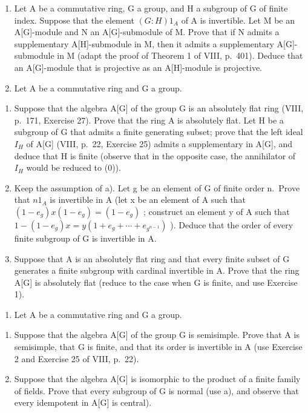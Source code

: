 
\begin{enumerate}
\def\labelenumi{\arabic{enumi})}
\item
  Let A be a commutative ring, G a group, and H a subgroup of G of finite index. Suppose that the element \((G:H)1_{A}\) of A is invertible. Let M be an A{[}G{]}-module and N an A{[}G{]}-submodule of M. Prove that if N admits a supplementary A{[}H{]}-submodule in M, then it admits a supplementary A{[}G{]}-submodule in M (adapt the proof of Theorem 1 of VIII, p.~401). Deduce that an A{[}G{]}-module that is projective as an A{[}H{]}-module is projective.
\item
  Let A be a commutative ring and G a group.
\end{enumerate}

\begin{enumerate}
\def\labelenumi{\alph{enumi})}
\item
  Suppose that the algebra A{[}G{]} of the group G is an absolutely flat ring (VIII, p.~171, Exercise 27). Prove that the ring A is absolutely flat. Let H be a subgroup of G that admits a finite generating subset; prove that the left ideal \(I_{H}\) of A{[}G{]} (VIII, p.~22, Exercise 25) admits a supplementary in A{[}G{]}, and deduce that H is finite (observe that in the opposite case, the annihilator of \(I_{H}\) would be reduced to (0)).
\item
  Keep the assumption of a). Let g be an element of G of finite order n.~Prove that \(n1_{A}\) is invertible in A (let x be an element of A such that \((1-e_{g})x(1-e_{g})=(1-e_{g})\) ; construct an element y of A such that \(1-(1-e_{g})x=y(1+e_{g}+\cdots+e_{g^{n-1}})\) ). Deduce that the order of every finite subgroup of G is invertible in A.
\item
  Suppose that A is an absolutely flat ring and that every finite subset of G generates a finite subgroup with cardinal invertible in A. Prove that the ring A{[}G{]} is absolutely flat (reduce to the case when G is finite, and use Exercise 1).
\end{enumerate}

\begin{enumerate}
\def\labelenumi{\arabic{enumi})}
\setcounter{enumi}{2}
\tightlist
\item
  Let A be a commutative ring and G a group.
\end{enumerate}

\begin{enumerate}
\def\labelenumi{\alph{enumi})}
\item
  Suppose that the algebra A{[}G{]} of the group G is semisimple. Prove that A is semisimple, that G is finite, and that its order is invertible in A (use Exercise 2 and Exercise 25 of VIII, p.~22).
\item
  Suppose that the algebra A{[}G{]} is isomorphic to the product of a finite family of fields. Prove that every subgroup of G is normal (use a), and observe that every idempotent in A{[}G{]} is central).
\end{enumerate}

